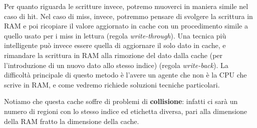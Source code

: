 \documentclass[a4paper,11pt]{article}
\begin{document}
Per quanto riguarda le scritture invece, potremo muoverci in maniera simile nel caso di hit.
Nel caso di miss, invece, potremmo pensare di svolgere la scrittura in RAM e poi ricopiare il valore aggiornato in cache con un procedimento simile a quello usato per i miss in lettura (regola \textit{write-through}).
Una tecnica più intelligente può invece essere quella di aggiornare il solo dato in cache, e rimandare la scrittura in RAM alla rimozione del dato dalla cache (per l'introduzione di un nuovo dato allo stesso indice) (regola \textit{write-back}).
La difficoltà principale di questo metodo è l'avere un agente che non è la CPU che scrive in RAM, e come vedremo richiede soluzioni tecniche particolari.

Notiamo che questa cache soffre di problemi di \textbf{collisione}: infatti ci sarà un numero di regioni con lo stesso indice ed etichetta diversa, pari alla dimensione della RAM fratto la dimensione della cache.
\end{document}
